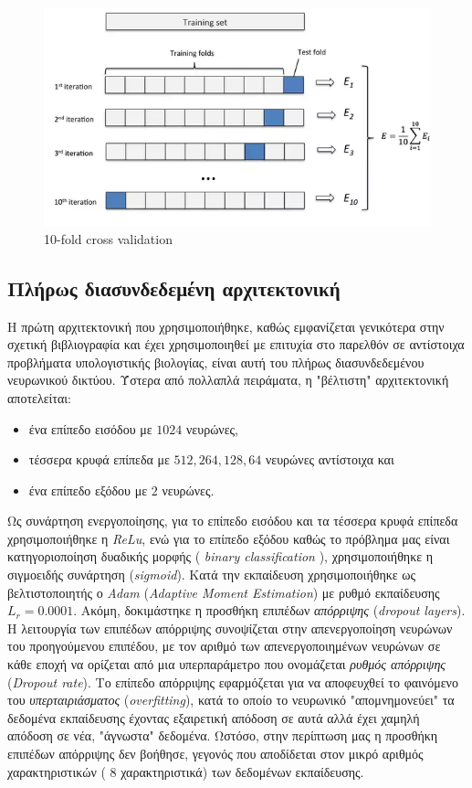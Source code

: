 \medskip
\begin{figure}[h]
  \centering
  \includegraphics[scale=0.8]{images/crossval.png}
  \caption{10-fold cross validation}
  \label{fig:crossval}
\end{figure}

\subsection{Πλήρως διασυνδεδεμένη αρχιτεκτονική}

Η πρώτη αρχιτεκτονική που χρησιμοποιήθηκε, καθώς εμφανίζεται γενικότερα στην σχετική βιβλιογραφία και έχει χρησιμοποιηθεί με επιτυχία στο παρελθόν σε αντίστοιχα προβλήματα υπολογιστικής βιολογίας, είναι αυτή του πλήρως διασυνδεδεμένου νευρωνικού δικτύου. Ύστερα από πολλαπλά πειράματα, η "βέλτιστη" αρχιτεκτονική αποτελείται:

\begin{itemize}
    \item ένα επίπεδο εισόδου με $1024$ νευρώνες,
    \item τέσσερα κρυφά επίπεδα με $512,264,128,64$ νευρώνες αντίστοιχα και
    \item ένα επίπεδο εξόδου με $2$ νευρώνες.
\end{itemize}

\medskip
Ως συνάρτηση ενεργοποίησης, για το επίπεδο εισόδου και τα τέσσερα κρυφά επίπεδα χρησιμοποιήθηκε η \textit{ReLu}, ενώ για το επίπεδο εξόδου καθώς το πρόβλημα μας είναι κατηγοριοποίηση δυαδικής μορφής ( \textit{binary classification} ), χρησιμοποιήθηκε η σιγμοειδής συνάρτηση (\textit{sigmoid}). Κατά την εκπαίδευση χρησιμοποιήθηκε ως βελτιστοποιητής ο \textit{Adam} (\textit{Adaptive Moment Estimation}) με ρυθμό εκπαίδευσης $\textit{L}_r = 0.0001$. Ακόμη, δοκιμάστηκε η προσθήκη επιπέδων \textit{απόρριψης} (\textit{dropout layers}). Η λειτουργία των επιπέδων απόρριψης συνοψίζεται στην απενεργοποίηση νευρώνων του προηγούμενου επιπέδου, με τον αριθμό των απενεργοποιημένων νευρώνων σε κάθε εποχή να ορίζεται από μια υπερπαράμετρο που ονομάζεται \textit{ρυθμός απόρριψης} (\textit{Dropout rate}). Το επίπεδο απόρριψης εφαρμόζεται για να αποφευχθεί το φαινόμενο του \textit{υπερταιριάσματος} (\textit{overfitting}), κατά το οποίο το νευρωνικό "απομνημονεύει" τα δεδομένα εκπαίδευσης έχοντας εξαιρετική απόδοση σε αυτά αλλά έχει χαμηλή απόδοση σε νέα, "άγνωστα" δεδομένα. Ωστόσο, στην περίπτωση μας η προσθήκη επιπέδων απόρριψης δεν βοήθησε, γεγονός που αποδίδεται στον μικρό αριθμός χαρακτηριστικών ( 8 χαρακτηριστικά) των δεδομένων εκπαίδευσης.     

